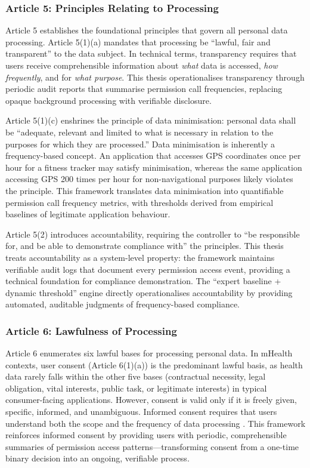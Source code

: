 \subsubsection{Article 5: Principles Relating to Processing}
Article 5 establishes the foundational principles that govern all personal data processing. Article 5(1)(a) mandates that processing be ``lawful, fair and transparent'' to the data subject. In technical terms, transparency requires that users receive comprehensible information about \emph{what} data is accessed, \emph{how frequently}, and for \emph{what purpose}. This thesis operationalises transparency through periodic audit reports that summarise permission call frequencies, replacing opaque background processing with verifiable disclosure.

Article 5(1)(c) enshrines the principle of data minimisation: personal data shall be ``adequate, relevant and limited to what is necessary in relation to the purposes for which they are processed.'' Data minimisation is inherently a frequency-based concept. An application that accesses GPS coordinates once per hour for a fitness tracker may satisfy minimisation, whereas the same application accessing GPS 200 times per hour for non-navigational purposes likely violates the principle. This framework translates data minimisation into quantifiable permission call frequency metrics, with thresholds derived from empirical baselines of legitimate application behaviour.

Article 5(2) introduces accountability, requiring the controller to ``be responsible for, and be able to demonstrate compliance with'' the principles. This thesis treats accountability as a system-level property: the framework maintains verifiable audit logs that document every permission access event, providing a technical foundation for compliance demonstration. The ``expert baseline + dynamic threshold'' engine directly operationalises accountability by providing automated, auditable judgments of frequency-based compliance.

\subsubsection{Article 6: Lawfulness of Processing}
Article 6 enumerates six lawful bases for processing personal data. In mHealth contexts, user consent (Article 6(1)(a)) is the predominant lawful basis, as health data rarely falls within the other five bases (contractual necessity, legal obligation, vital interests, public task, or legitimate interests) in typical consumer-facing applications. However, consent is valid only if it is freely given, specific, informed, and unambiguous. Informed consent requires that users understand both the scope and the frequency of data processing \cite{14}. This framework reinforces informed consent by providing users with periodic, comprehensible summaries of permission access patterns—transforming consent from a one-time binary decision into an ongoing, verifiable process.

